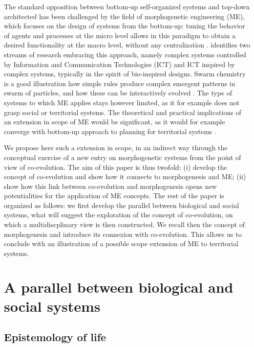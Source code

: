 \documentclass[letterpaper]{article}
\begin{document}
The standard opposition between bottom-up self-organized systems and top-down architected has been challenged by the field of morphogenetic engineering (ME), which focuses on the design of systems from the bottom-up: tuning the behavior of agents and processes at the micro level allows in this paradigm to obtain a desired functionality at the macro level, without any centralization \citep{doursat2013review}. \cite{doursat2011myriads} identifies two streams of research embracing this approach, namely complex systems controlled by Information and Communication Technologies (ICT) and ICT inspired by complex systems, typically in the spirit of bio-inspired designs. Swarm chemistry \citep{sayama2009swarm} is a good illustration how simple rules produce complex emergent patterns in swarm of particles, and how these can be interactively evolved \citep{sayama2009enhancing}. The type of systems to which ME applies stays however limited, as it for example does not grasp social or territorial systems. The theoretical and practical implications of an extension in scope of ME would be significant, as it would for example converge with bottom-up approach to planning for territorial systems \citep{batty2007cities}. 

We propose here such a extension in scope, in an indirect way through the conceptual exercise of a new entry on morphogenetic systems from the point of view of co-evolution. The aim of this paper is thus twofold: (i) develop the concept of co-evolution and show how it connects to morphogenesis and ME; (ii) show how this link between co-evolution and morphogenesis opens new potentialities for the application of ME concepts. The rest of the paper is organized as follows: we first develop the parallel between biological and social systems, what will suggest the exploration of the concept of co-evolution, on which a multidiscplinary view is then constructed. We recall then the concept of morphogenesis and introduce its connexion with co-evolution. This allows us to conclude with an illustration of a possible scope extension of ME to territorial systems.



\section{A parallel between biological and social systems}


\subsection{Epistemology of life}
\end{document}
